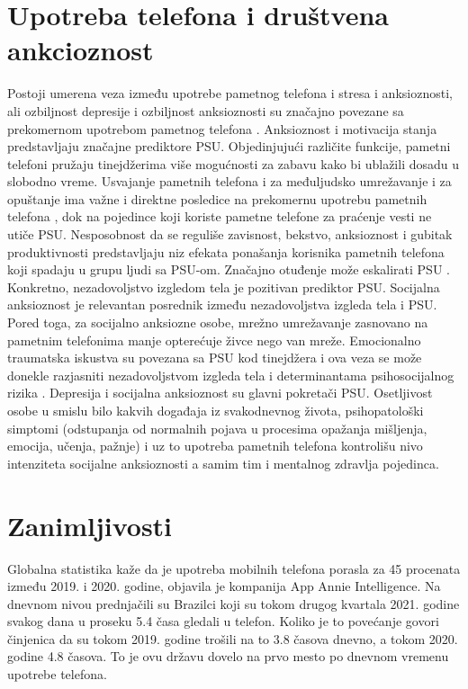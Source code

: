 \documentclass[a4paper]{article}
\begin{document}
\newpage
\section{Upotreba telefona i društvena ankcioznost}
Postoji umerena veza između upotrebe pametnog telefona i stresa i anksioznosti,
ali ozbiljnost depresije i ozbiljnost anksioznosti su značajno povezane
sa prekomernom upotrebom pametnog telefona \cite{anxiety}.
\newline
Anksioznost i motivacija stanja predstavljaju značajne prediktore PSU.
Objedinjujući različite funkcije, pametni telefoni pružaju tinejdžerima više
mogućnosti za zabavu kako bi ublažili dosadu u slobodno vreme.
Usvajanje pametnih telefona i za međuljudsko umrežavanje i za opuštanje
ima važne i direktne posledice na prekomernu upotrebu pametnih telefona \cite{face},
dok na pojedince koji koriste pametne telefone za praćenje vesti ne utiče PSU.
Nesposobnost da se reguliše zavisnost, bekstvo, anksioznost i
gubitak produktivnosti predstavljaju niz efekata
ponašanja korisnika pametnih telefona koji spadaju u grupu ljudi sa PSU-om.
Značajno otuđenje može eskalirati PSU \cite{addict}.
\newline
Konkretno, nezadovoljstvo izgledom tela je pozitivan prediktor PSU.
Socijalna anksioznost je relevantan posrednik između nezadovoljstva
izgleda tela i PSU. Pored toga, za socijalno anksiozne osobe,
mrežno umrežavanje zasnovano na pametnim telefonima manje opterećuje
živce nego van mreže.
Emocionalno traumatska iskustva su povezana sa PSU
kod tinejdžera i ova veza se može donekle razjasniti nezadovoljstvom
izgleda tela i determinantama psihosocijalnog rizika \cite{child}.
\newline
\newline
Depresija i socijalna anksioznost su glavni pokretači PSU.
Osetljivost osobe u smislu bilo kakvih događaja iz svakodnevnog života,
psihopatološki simptomi (odstupanja od normalnih pojava u procesima opažanja
mišljenja, emocija, učenja, pažnje) i uz to upotreba pametnih telefona
kontrolišu nivo intenziteta socijalne anksioznosti a samim tim i mentalnog zdravlja
pojedinca.

\newpage

\section{Zanimljivosti}

Globalna statistika kaže da je upotreba mobilnih telefona porasla
za 45 procenata između 2019. i 2020. godine, objavila je kompanija
App Annie Intelligence. Na dnevnom nivou prednjačili su Brazilci
koji su tokom drugog kvartala 2021. godine svakog dana u proseku
5.4 časa gledali u telefon. Koliko je to povećanje govori činjenica
da su tokom 2019. godine trošili na to 3.8 časova dnevno, a tokom
2020. godine 4.8 časova. To je ovu državu dovelo na prvo mesto po
dnevnom vremenu upotrebe telefona.
\end{document}
